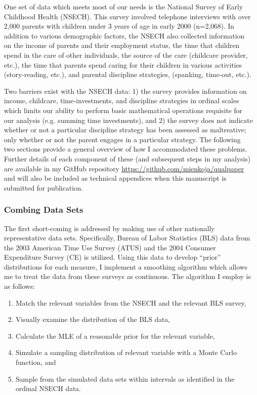\documentclass[1p, review]{elsarticle}\usepackage[]{graphicx}\usepackage[]{color}
\begin{document}
One set of data which meets most of our needs is the National Survey of Early Childhood Health (NSECH). This survey involved telephone interviews with over 2,000 parents with children under 3 years of age in early 2000 (n=2,068). In addition to various demographic factors, the NSECH also collected information on the income of parents and their employment status, the time that children spend in the care of other individuals, the source of the care (childcare provider, etc.), the time that parents spend caring for their children in various activities (story-reading, etc.), and parental discipline strategies, (spanking, time-out, etc.). 

Two barriers exist with the NSECH data: 1) the survey provides information on income, childcare, time-investments, and discipline strategies in ordinal scales which limits our ability to perform basic mathematical operations requisite for our analysis (e.g. summing time investments), and 2) the survey does not indicate whether or not a particular discipline strategy has been assessed as maltreative; only whether or not the parent engages in a particular strategy. The following two sections provide a general overview of how I accommodated these problems. Further details of each component of these (and subsequent steps in my analysis) are available in my GitHub repository \href{https://github.com/mienkoja/qualpaper}{https://github.com/mienkoja/qualpaper} and will also be included as technical appendices when this manuscript is submitted for publication. 

\subsubsection{Combing Data Sets}

The first short-coming is addressed by making use of other nationally representative data sets. Specifically, Bureau of Labor Statistics (BLS) data from the 2003 American Time Use Survey (ATUS) and the 2004 Consumer Expenditure Survey (CE) is utilized. Using this data to develop ``prior'' distributions for each measure, I implement a smoothing algorithm which allows me to treat the data from these surveys as continuous. The algorithm I employ is as follows:

\begin{enumerate}
  \item Match the relevant variables from the NSECH and the relevant BLS survey,  
  \item Visually examine the distribution of the BLS data, 
  \item Calculate the MLE of a reasonable prior for the relevant variable,  
  \item Simulate a sampling distribution of relevant variable with a Monte Carlo function, and 
  \item Sample from the simulated data sets within intervals as identified in the ordinal NSECH data.  
\end{enumerate}
\end{document}
